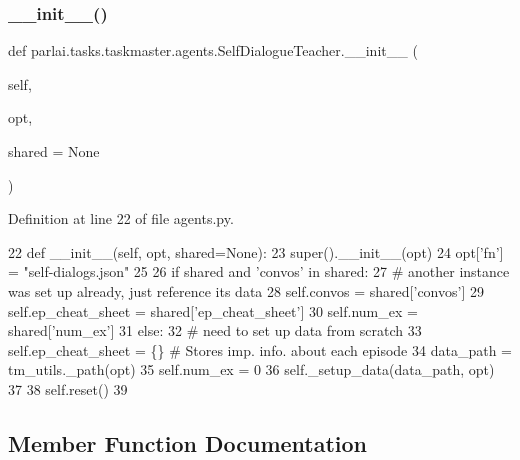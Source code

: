 \subsubsection{\texorpdfstring{\+\_\+\+\_\+init\+\_\+\+\_\+()}{\_\_init\_\_()}}
{\footnotesize\ttfamily def parlai.\+tasks.\+taskmaster.\+agents.\+Self\+Dialogue\+Teacher.\+\_\+\+\_\+init\+\_\+\+\_\+ (\begin{DoxyParamCaption}\item[{}]{self,  }\item[{}]{opt,  }\item[{}]{shared = {\ttfamily None} }\end{DoxyParamCaption})}



Definition at line 22 of file agents.\+py.


\begin{DoxyCode}
22     \textcolor{keyword}{def }\_\_init\_\_(self, opt, shared=None):
23         super().\_\_init\_\_(opt)
24         opt[\textcolor{stringliteral}{'fn'}] = \textcolor{stringliteral}{"self-dialogs.json"}
25 
26         \textcolor{keywordflow}{if} shared \textcolor{keywordflow}{and} \textcolor{stringliteral}{'convos'} \textcolor{keywordflow}{in} shared:
27             \textcolor{comment}{# another instance was set up already, just reference its data}
28             self.convos = shared[\textcolor{stringliteral}{'convos'}]
29             self.ep\_cheat\_sheet = shared[\textcolor{stringliteral}{'ep\_cheat\_sheet'}]
30             self.num\_ex = shared[\textcolor{stringliteral}{'num\_ex'}]
31         \textcolor{keywordflow}{else}:
32             \textcolor{comment}{# need to set up data from scratch}
33             self.ep\_cheat\_sheet = \{\}  \textcolor{comment}{# Stores imp. info. about each episode}
34             data\_path = tm\_utils.\_path(opt)
35             self.num\_ex = 0
36             self.\_setup\_data(data\_path, opt)
37 
38         self.reset()
39 
\end{DoxyCode}


\subsection{Member Function Documentation}
\mbox{\label{classparlai_1_1tasks_1_1taskmaster_1_1agents_1_1SelfDialogueTeacher_a328edd2f9d9681f6e1671b91c81046e5}} 
